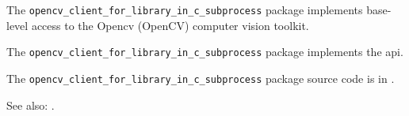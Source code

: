 
The {\tt opencv\_client\_for\_library\_in\_c\_subprocess} package implements base-level access to the Opencv (OpenCV) computer
vision toolkit.

The {\tt opencv\_client\_for\_library\_in\_c\_subprocess} package implements the  api.

The {\tt opencv\_client\_for\_library\_in\_c\_subprocess} package source code is in .

See also:  .


